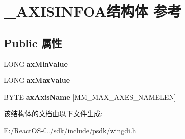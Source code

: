\hypertarget{struct___a_x_i_s_i_n_f_o_a}{}\section{\+\_\+\+A\+X\+I\+S\+I\+N\+F\+O\+A结构体 参考}
\label{struct___a_x_i_s_i_n_f_o_a}
\subsection*{Public 属性}
\begin{DoxyCompactItemize}
\item 
\mbox{\label{struct___a_x_i_s_i_n_f_o_a_af335d0c421b8645beb6f8e5f67c08f73}} 
L\+O\+NG {\bfseries ax\+Min\+Value}
\item 
\mbox{\label{struct___a_x_i_s_i_n_f_o_a_a460b63636aea18c93a6c5f3ecf2326a2}} 
L\+O\+NG {\bfseries ax\+Max\+Value}
\item 
\mbox{\label{struct___a_x_i_s_i_n_f_o_a_a8bd46f6a5740d45580914146f19d23e1}} 
B\+Y\+TE {\bfseries ax\+Axis\+Name} \mbox{[}M\+M\+\_\+\+M\+A\+X\+\_\+\+A\+X\+E\+S\+\_\+\+N\+A\+M\+E\+L\+EN\mbox{]}
\end{DoxyCompactItemize}


该结构体的文档由以下文件生成\+:\begin{DoxyCompactItemize}
\item 
E\+:/\+React\+O\+S-\/0../sdk/include/psdk/wingdi.\+h\end{DoxyCompactItemize}

